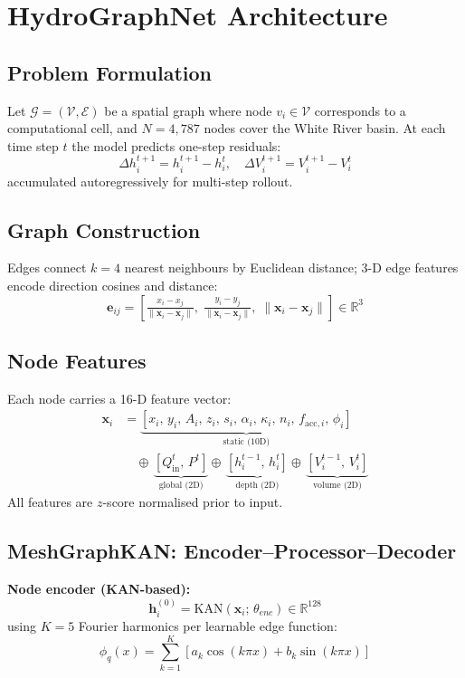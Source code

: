 \documentclass[conference]{IEEEtran}
\begin{document}
\section{HydroGraphNet Architecture}
\label{sec:arch}

\subsection{Problem Formulation}
Let $\mathcal{G}=(\mathcal{V},\mathcal{E})$ be a spatial graph where node
$v_i\in\mathcal{V}$ corresponds to a computational cell, and $N=4{,}787$
nodes cover the White River basin. At each time step $t$ the model predicts
one-step residuals:
\begin{equation}
  \Delta h_i^{t+1} = h_i^{t+1} - h_i^t, \quad
  \Delta V_i^{t+1} = V_i^{t+1} - V_i^t
\end{equation}
accumulated autoregressively for multi-step rollout.

\subsection{Graph Construction}
Edges connect $k=4$ nearest neighbours by Euclidean distance; 3-D edge
features encode direction cosines and distance:
\begin{equation}
  \mathbf{e}_{ij} = \left[
    \tfrac{x_i-x_j}{\|\mathbf{x}_i-\mathbf{x}_j\|},\;
    \tfrac{y_i-y_j}{\|\mathbf{x}_i-\mathbf{x}_j\|},\;
    \|\mathbf{x}_i-\mathbf{x}_j\|
  \right] \in \mathbb{R}^3
\end{equation}

\subsection{Node Features}
Each node carries a 16-D feature vector:
\begin{align}
  \mathbf{x}_i &=
    \underbrace{[x_i,\,y_i,\,A_i,\,z_i,\,s_i,\,\alpha_i,\,
      \kappa_i,\,n_i,\,f_{\text{acc},i},\,\phi_i]}_{\text{static (10D)}}
    \nonumber\\
  &\quad\oplus\,
    \underbrace{[Q_{\text{in}}^t,\,P^t]}_{\text{global (2D)}}
    \oplus\,
    \underbrace{[h_i^{t-1},\,h_i^t]}_{\text{depth (2D)}}
    \oplus\,
    \underbrace{[V_i^{t-1},\,V_i^t]}_{\text{volume (2D)}}
\end{align}
All features are $z$-score normalised prior to input.

\subsection{MeshGraphKAN: Encoder--Processor--Decoder}
\textbf{Node encoder (KAN-based):}
\begin{equation}
  \mathbf{h}_i^{(0)} = \text{KAN}(\mathbf{x}_i;\,\theta_{enc})
  \in \mathbb{R}^{128}
\end{equation}
using $K=5$ Fourier harmonics per learnable edge function:
\begin{equation}
  \phi_q(x) = \sum_{k=1}^{K}\left[a_k\cos(k\pi x)+b_k\sin(k\pi x)\right]
\end{equation}
\end{document}
